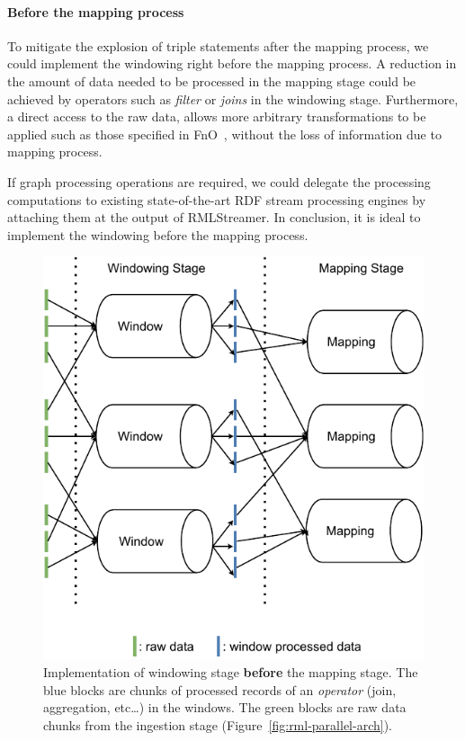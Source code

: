 \paragraph{Before the mapping process}%
\label{par:Before the mapping process}
To mitigate the explosion of triple statements after the mapping process, we could implement 
the windowing right before the mapping process. A reduction in the amount of 
data needed to be processed in the mapping stage could be achieved by operators 
such as \emph{filter} or \emph{joins} in the windowing stage. Furthermore, a direct 
access to the raw data, allows more arbitrary transformations to be applied such as 
those specified in FnO~\cite{fno_ben}, without the loss of 
information due to mapping process. 

If graph processing operations are required, we could delegate the processing computations to 
existing state-of-the-art RDF stream processing engines by attaching them at the output of 
RMLStreamer. In conclusion, it is ideal to implement the windowing before the mapping process. 


\begin{figure}[htpb]
    \centering
    \includegraphics[width=0.7\linewidth]{fig/window_site.pdf}
    \caption{Implementation of windowing stage \textbf{before} the mapping stage. The blue blocks 
    are chunks of processed records of an \emph{operator} (join, aggregation, etc\dots) in the windows. 
    The green blocks are raw data chunks from the 
    ingestion stage (Figure~\ref{fig:rml-parallel-arch}). }%
    \label{fig:fig/s}
\end{figure}


